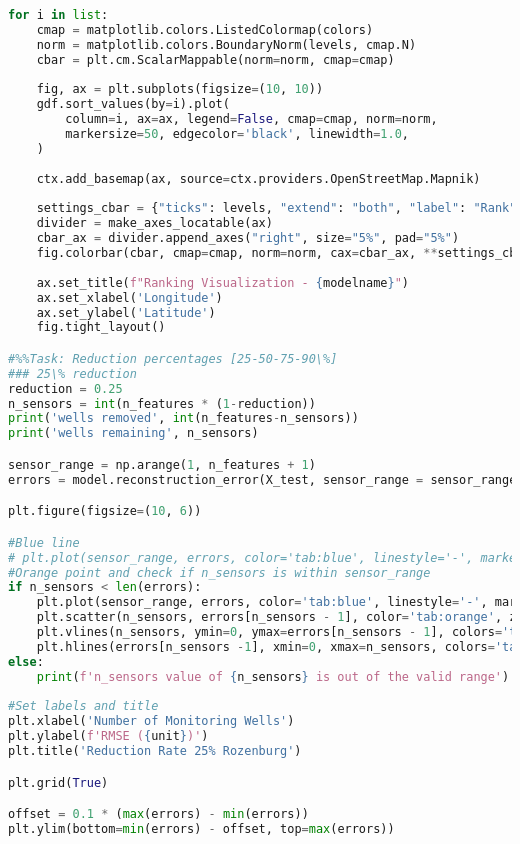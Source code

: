 \begin{lstlisting}[language=Python]
for i in list:
    cmap = matplotlib.colors.ListedColormap(colors)
    norm = matplotlib.colors.BoundaryNorm(levels, cmap.N)
    cbar = plt.cm.ScalarMappable(norm=norm, cmap=cmap)
    
    fig, ax = plt.subplots(figsize=(10, 10))
    gdf.sort_values(by=i).plot(
        column=i, ax=ax, legend=False, cmap=cmap, norm=norm,
        markersize=50, edgecolor='black', linewidth=1.0,
    )
    
    ctx.add_basemap(ax, source=ctx.providers.OpenStreetMap.Mapnik)
    
    settings_cbar = {"ticks": levels, "extend": "both", "label": "Rank"}
    divider = make_axes_locatable(ax)
    cbar_ax = divider.append_axes("right", size="5%", pad="5%")
    fig.colorbar(cbar, cmap=cmap, norm=norm, cax=cbar_ax, **settings_cbar)
    
    ax.set_title(f"Ranking Visualization - {modelname}")
    ax.set_xlabel('Longitude')
    ax.set_ylabel('Latitude')
    fig.tight_layout()

#%%Task: Reduction percentages [25-50-75-90\%]
### 25\% reduction
reduction = 0.25
n_sensors = int(n_features * (1-reduction))
print('wells removed', int(n_features-n_sensors))
print('wells remaining', n_sensors)

sensor_range = np.arange(1, n_features + 1)
errors = model.reconstruction_error(X_test, sensor_range = sensor_range)

plt.figure(figsize=(10, 6))

#Blue line 
# plt.plot(sensor_range, errors, color='tab:blue', linestyle='-', marker='')
#Orange point and check if n_sensors is within sensor_range
if n_sensors < len(errors):
    plt.plot(sensor_range, errors, color='tab:blue', linestyle='-', marker='')
    plt.scatter(n_sensors, errors[n_sensors - 1], color='tab:orange', zorder=5)
    plt.vlines(n_sensors, ymin=0, ymax=errors[n_sensors - 1], colors='tab:orange', linestyle='--', linewidth=2.0, label='Selected number of wells')
    plt.hlines(errors[n_sensors -1], xmin=0, xmax=n_sensors, colors='tab:orange', linestyle='--', linewidth=2.0)
else: 
    print(f'n_sensors value of {n_sensors} is out of the valid range')
    
#Set labels and title 
plt.xlabel('Number of Monitoring Wells')
plt.ylabel(f'RMSE ({unit})')
plt.title('Reduction Rate 25% Rozenburg')

plt.grid(True)

offset = 0.1 * (max(errors) - min(errors))
plt.ylim(bottom=min(errors) - offset, top=max(errors))


\end{lstlisting}
